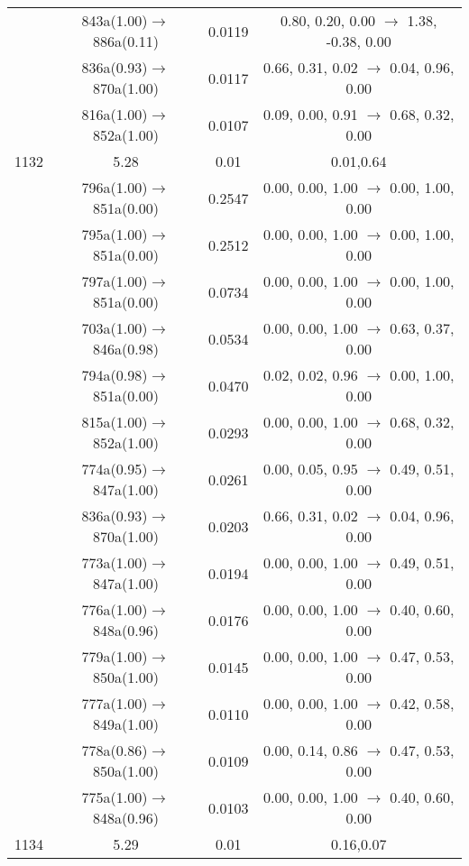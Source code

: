\documentclass[10pt,a4paper]{article}
\begin{document}
\begin{longtable}{c|c|c|c}
 	& 843a(1.00)$\rightarrow$886a(0.11) &	 0.0119 &	 0.80, 0.20, 0.00 $\rightarrow$ 1.38, -0.38, 0.00 \\ 
 	& 836a(0.93)$\rightarrow$870a(1.00) &	 0.0117 &	 0.66, 0.31, 0.02 $\rightarrow$ 0.04, 0.96, 0.00 \\ 
 	& 816a(1.00)$\rightarrow$852a(1.00) &	 0.0107 &	 0.09, 0.00, 0.91 $\rightarrow$ 0.68, 0.32, 0.00 \\ 
 \hline1132 &	 5.28 &	 0.01 &	 0.01,0.64 \\ 
  	& 796a(1.00)$\rightarrow$851a(0.00) &	 0.2547 &	 0.00, 0.00, 1.00 $\rightarrow$ 0.00, 1.00, 0.00 \\ 
 	& 795a(1.00)$\rightarrow$851a(0.00) &	 0.2512 &	 0.00, 0.00, 1.00 $\rightarrow$ 0.00, 1.00, 0.00 \\ 
 	& 797a(1.00)$\rightarrow$851a(0.00) &	 0.0734 &	 0.00, 0.00, 1.00 $\rightarrow$ 0.00, 1.00, 0.00 \\ 
 	& 703a(1.00)$\rightarrow$846a(0.98) &	 0.0534 &	 0.00, 0.00, 1.00 $\rightarrow$ 0.63, 0.37, 0.00 \\ 
 	& 794a(0.98)$\rightarrow$851a(0.00) &	 0.0470 &	 0.02, 0.02, 0.96 $\rightarrow$ 0.00, 1.00, 0.00 \\ 
 	& 815a(1.00)$\rightarrow$852a(1.00) &	 0.0293 &	 0.00, 0.00, 1.00 $\rightarrow$ 0.68, 0.32, 0.00 \\ 
 	& 774a(0.95)$\rightarrow$847a(1.00) &	 0.0261 &	 0.00, 0.05, 0.95 $\rightarrow$ 0.49, 0.51, 0.00 \\ 
 	& 836a(0.93)$\rightarrow$870a(1.00) &	 0.0203 &	 0.66, 0.31, 0.02 $\rightarrow$ 0.04, 0.96, 0.00 \\ 
 	& 773a(1.00)$\rightarrow$847a(1.00) &	 0.0194 &	 0.00, 0.00, 1.00 $\rightarrow$ 0.49, 0.51, 0.00 \\ 
 	& 776a(1.00)$\rightarrow$848a(0.96) &	 0.0176 &	 0.00, 0.00, 1.00 $\rightarrow$ 0.40, 0.60, 0.00 \\ 
 	& 779a(1.00)$\rightarrow$850a(1.00) &	 0.0145 &	 0.00, 0.00, 1.00 $\rightarrow$ 0.47, 0.53, 0.00 \\ 
 	& 777a(1.00)$\rightarrow$849a(1.00) &	 0.0110 &	 0.00, 0.00, 1.00 $\rightarrow$ 0.42, 0.58, 0.00 \\ 
 	& 778a(0.86)$\rightarrow$850a(1.00) &	 0.0109 &	 0.00, 0.14, 0.86 $\rightarrow$ 0.47, 0.53, 0.00 \\ 
 	& 775a(1.00)$\rightarrow$848a(0.96) &	 0.0103 &	 0.00, 0.00, 1.00 $\rightarrow$ 0.40, 0.60, 0.00 \\ 
 \hline1134 &	 5.29 &	 0.01 &	 0.16,0.07 \\ 

\end{longtable}
\end{document}

